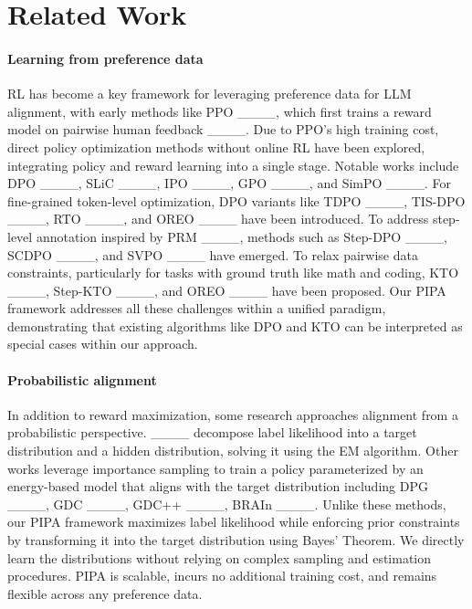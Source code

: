 \section{Related Work}
\paragraph{Learning from preference data}
RL has become a key framework for leveraging preference data for LLM alignment, with early methods like PPO ____, which first trains a reward model on pairwise human feedback ____. Due to PPO’s high training cost, direct policy optimization methods without online RL have been explored, integrating policy and reward learning into a single stage. Notable works include DPO ____, SLiC ____, IPO ____, GPO ____, and SimPO ____.
For fine-grained token-level optimization, DPO variants like TDPO ____, TIS-DPO ____, RTO ____, and OREO ____ have been introduced. To address step-level annotation inspired by PRM ____, methods such as Step-DPO ____, SCDPO ____, and SVPO ____ have emerged. To relax pairwise data constraints, particularly for tasks with ground truth like math and coding, KTO ____, Step-KTO  ____, and OREO ____ have been proposed. 
Our PIPA framework addresses all these challenges within a unified paradigm, demonstrating that existing algorithms like DPO and KTO can be interpreted as special cases within our approach.

\paragraph{Probabilistic alignment}
In addition to reward maximization, some research approaches alignment from a probabilistic perspective. ____ decompose label likelihood into a target distribution and a hidden distribution, solving it using the EM algorithm. Other works leverage importance sampling to train a policy parameterized by an energy-based model that aligns with the target distribution including DPG ____, GDC ____, GDC++ ____, BRAIn ____.
Unlike these methods, our PIPA framework maximizes label likelihood while enforcing prior constraints by transforming it into the target distribution using Bayes' Theorem. We directly learn the distributions without relying on complex sampling and estimation procedures. PIPA is scalable, incurs no additional training cost, and remains flexible across any preference data.